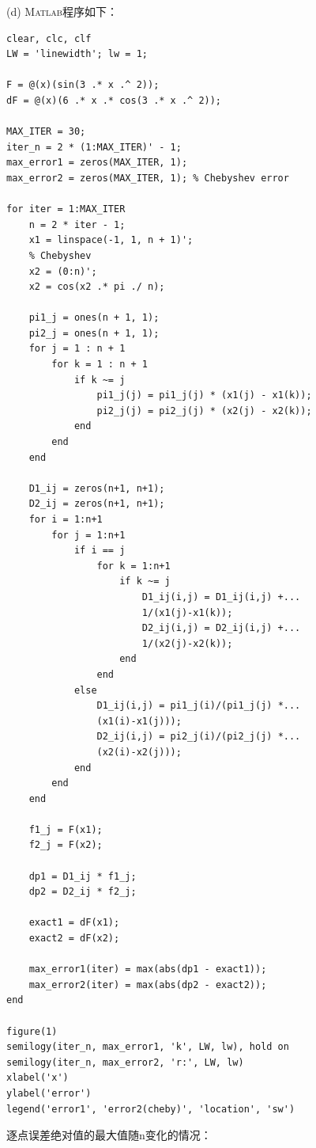 \documentclass[12pt,a4paper,utf8]{ctexart}
\begin{document}
\begin{enumerate}
\subitem(d)
\textsc{Matlab}程序如下：
\begin{lstlisting}[frame=single]
clear, clc, clf
LW = 'linewidth'; lw = 1;

F = @(x)(sin(3 .* x .^ 2));
dF = @(x)(6 .* x .* cos(3 .* x .^ 2));

MAX_ITER = 30;
iter_n = 2 * (1:MAX_ITER)' - 1;
max_error1 = zeros(MAX_ITER, 1);
max_error2 = zeros(MAX_ITER, 1); % Chebyshev error

for iter = 1:MAX_ITER
    n = 2 * iter - 1;
    x1 = linspace(-1, 1, n + 1)';
    % Chebyshev
    x2 = (0:n)';
    x2 = cos(x2 .* pi ./ n);
    
    pi1_j = ones(n + 1, 1);
    pi2_j = ones(n + 1, 1);
    for j = 1 : n + 1
        for k = 1 : n + 1
            if k ~= j
                pi1_j(j) = pi1_j(j) * (x1(j) - x1(k));
                pi2_j(j) = pi2_j(j) * (x2(j) - x2(k));
            end
        end
    end

    D1_ij = zeros(n+1, n+1);
    D2_ij = zeros(n+1, n+1);
    for i = 1:n+1
        for j = 1:n+1
            if i == j
                for k = 1:n+1
                    if k ~= j
                        D1_ij(i,j) = D1_ij(i,j) +...
                        1/(x1(j)-x1(k));
                        D2_ij(i,j) = D2_ij(i,j) +...
                        1/(x2(j)-x2(k));
                    end
                end
            else
                D1_ij(i,j) = pi1_j(i)/(pi1_j(j) *...
                (x1(i)-x1(j)));
                D2_ij(i,j) = pi2_j(i)/(pi2_j(j) *...
                (x2(i)-x2(j)));
            end
        end
    end

    f1_j = F(x1);
    f2_j = F(x2);

    dp1 = D1_ij * f1_j;
    dp2 = D2_ij * f2_j;

    exact1 = dF(x1);
    exact2 = dF(x2);

    max_error1(iter) = max(abs(dp1 - exact1));
    max_error2(iter) = max(abs(dp2 - exact2));
end

figure(1)
semilogy(iter_n, max_error1, 'k', LW, lw), hold on
semilogy(iter_n, max_error2, 'r:', LW, lw)
xlabel('x')
ylabel('error')
legend('error1', 'error2(cheby)', 'location', 'sw')
\end{lstlisting}

逐点误差绝对值的最大值随n变化的情况：


\end{enumerate}
\end{document}
